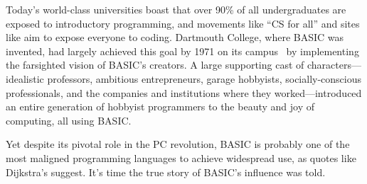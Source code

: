 Today's world-class universities boast that over 90\% of all
undergraduates are exposed to introductory programming, and movements
like ``CS for all'' and sites like  aim to expose everyone
to coding.
Dartmouth College, where BASIC was invented, had largely
achieved this goal by 1971 on its campus~\cite{man_and_computer} by implementing the
farsighted vision of BASIC's creators.
A large supporting cast of characters---idealistic professors,
ambitious entrepreneurs, garage hobbyists, socially-conscious
professionals, and the companies and institutions where they
worked---introduced  an entire generation
of hobbyist programmers to the beauty and joy of computing, all using BASIC.

Yet despite its pivotal role in the PC revolution, BASIC is probably
one of the most maligned programming languages to achieve widespread
use, as quotes like Dijkstra's suggest.
It's time the true story of BASIC's influence was told.

